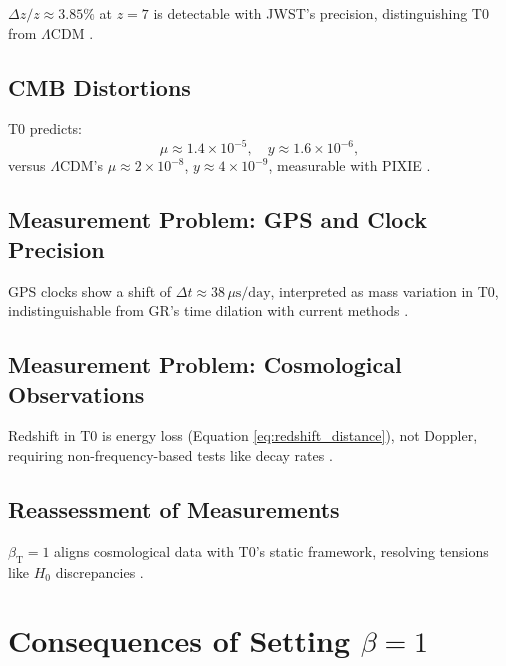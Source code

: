\documentclass[twocolumn,aps,prl]{revtex4-2}
\newcommand{\betaT}{\beta_{\text{T}}}
\newcommand{\LCDM}{\Lambda\text{CDM}}
\begin{document}
	\(\Delta z / z \approx 3.85\%\) at \(z = 7\) is detectable with JWST’s precision, distinguishing T0 from \(\LCDM\) \cite{pascher_params_2025}.
	
	\subsection{CMB Distortions}
	\label{subsec:cmb_distortions_test}
	
	T0 predicts:
	\begin{equation}
		\mu \approx 1.4 \times 10^{-5}, \quad y \approx 1.6 \times 10^{-6},
		\label{eq:distortion_parameters}
	\end{equation}
	versus \(\LCDM\)’s \(\mu \approx 2 \times 10^{-8}\), \(y \approx 4 \times 10^{-9}\), measurable with PIXIE \cite{pascher_temp_2025}.
	
	\subsection{Measurement Problem: GPS and Clock Precision}
	\label{subsec:gps_clock_problem}
	
	GPS clocks show a shift of \(\Delta t \approx 38 \, \mu\text{s/day}\), interpreted as mass variation in T0, indistinguishable from GR’s time dilation with current methods \cite{pascher_quantum_2025}.
	
	\subsection{Measurement Problem: Cosmological Observations}
	\label{subsec:cosmological_measurement_problem}
	
	Redshift in T0 is energy loss (Equation \ref{eq:redshift_distance}), not Doppler, requiring non-frequency-based tests like decay rates \cite{pascher_alphabeta_2025}.
	
	\subsection{Reassessment of Measurements}
	\label{subsec:reassessment_measurements}
	
	\(\betaT = 1\) aligns cosmological data with T0’s static framework, resolving tensions like \(H_0\) discrepancies \cite{DiValentino2021}.
	
	\section{Consequences of Setting \(\beta = 1\)}
	\label{sec:consequences_beta}
	
\end{document}
